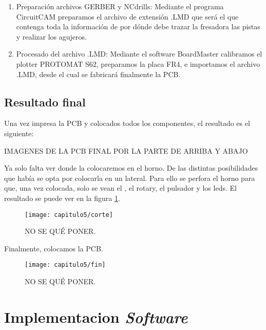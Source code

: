 \begin{enumerate}
\item Preparación archivos GERBER y NCdrills: Mediante el programa CircuitCAM preparamos el archivo de extensión .LMD que será el que contenga toda la información de por dónde debe trazar la fresadora las pistas y realizar los agujeros.
\item Procesado del archivo .LMD: Mediante el software BoardMaster calibramos el plotter PROTOMAT S62, preparamos la placa FR4, e importamos el archivo .LMD, desde el cual se fabricará finalmente la PCB.
\end{enumerate}

\subsection{Resultado final}
Una vez impresa la PCB y colocados todos los componentes, el resultado es el siguiente:

IMAGENES DE LA PCB FINAL POR LA PARTE DE ARRIBA Y ABAJO

Ya solo falta ver donde la colocaremos en el horno. De las distintas posibilidades que había se opta por colocarla en un lateral. Para ello se perfora el horno para que, una vez colocada, solo se vean el , el rotary, el pulsador y los leds. El resultado se puede ver en la figura \ref{fig:corte}.


\smallskip
\begin{figure}[H]%
\noindent \begin{centering}
\texttt{[image: capitulo5/corte]}
\par\end{centering}
\caption{\label{fig:corte} NO SE QUÉ PONER.}
\end{figure}
\smallskip

Finalmente, colocamos la \acrshort{PCB}. 

\smallskip
\begin{figure}[H]%
\noindent \begin{centering}
\texttt{[image: capitulo5/fin]}
\par\end{centering}
\caption{\label{fig:fin} NO SE QUÉ PONER.}
\end{figure}
\smallskip

\section{Implementacion \textit{Software}}

